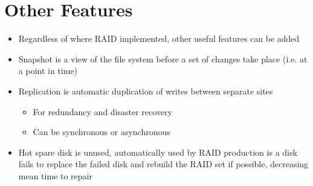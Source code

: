 \documentclass{article}[18pt]
\begin{document}
\section{Other Features}
\begin{itemize}
	\item Regardless of where RAID implemented, other useful features can be added
	\item Snapshot is a view of the file system before a set of changes take place (i.e. at a point in time)
	\item Replication is automatic duplication of writes between separate sites
	\begin{itemize}
		\item For redundancy and disaster recovery
		\item Can be synchronous or asynchronous
	\end{itemize}
	\item Hot spare disk is unused, automatically used by RAID production is a disk fails to replace the failed disk and rebuild the RAID set if possible, decreasing mean time to repair
\end{itemize}
\end{document}
